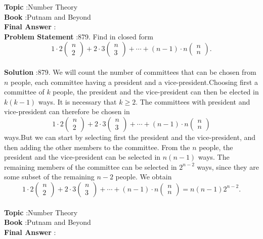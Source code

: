 \documentclass[10pt]{article}
\begin{document}
\textbf{Topic} :Number Theory\\
\textbf{Book} :Putnam and Beyond\\
\textbf{Final Answer} :\\


\textbf{Problem Statement} :879. Find in closed form$$ 1 \cdot 2\left(\begin{array}{l} n \\ 2 \end{array}\right)+2 \cdot 3\left(\begin{array}{l} n \\ 3 \end{array}\right)+\cdots+(n-1) \cdot n\left(\begin{array}{l} n \\ n \end{array}\right) . $$\\
\textbf{Solution} :879. We will count the number of committees that can be chosen from $n$ people, each committee having a president and a vice-president.Choosing first a committee of $k$ people, the president and the vice-president can then be elected in $k(k-1)$ ways. It is necessary that $k \geq 2$. The committees with president and vice-president can therefore be chosen in$$ 1 \cdot 2\left(\begin{array}{l} n \\ 2 \end{array}\right)+2 \cdot 3\left(\begin{array}{l} n \\ 3 \end{array}\right)+\cdots+(n-1) \cdot n\left(\begin{array}{l} n \\ n \end{array}\right) $$ways.But we can start by selecting first the president and the vice-president, and then adding the other members to the committee. From the $n$ people, the president and the vice-president can be selected in $n(n-1)$ ways. The remaining members of the committee can be selected in $2^{n-2}$ ways, since they are some subset of the remaining $n-2$ people. We obtain$$ 1 \cdot 2\left(\begin{array}{l} n \\ 2 \end{array}\right)+2 \cdot 3\left(\begin{array}{l} n \\ 3 \end{array}\right)+\cdots+(n-1) \cdot n\left(\begin{array}{l} n \\ n \end{array}\right)=n(n-1) 2^{n-2} . $$\\
\textbf{Topic} :Number Theory\\
\textbf{Book} :Putnam and Beyond\\
\textbf{Final Answer} :\\
\end{document}
